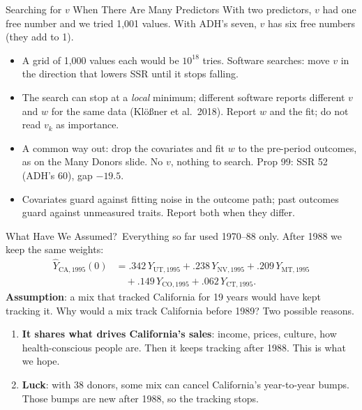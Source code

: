 \documentclass[aspectratio=169,11pt,xcolor=dvipsnames]{beamer}
\newcommand{\srcp}[1]{{\scriptsize\color{gray}(#1)}}
\newcommand{\core}{\,\raisebox{0.6pt}{\textcolor{corestar}{$\bigstar$}}}
\begin{document}
\begin{frame}{Searching for $v$ When There Are Many Predictors}
With two predictors, $v$ had one free number and we tried 1,001 values. With
ADH's seven, $v$ has six free numbers (they add to 1).
\vskip2pt
\begin{itemize}\itemsep3pt
  \item A grid of 1,000 values each would be $10^{18}$ tries. Software
        \alert{searches}: move $v$ in the direction that lowers SSR until it
        stops falling.
  \item The search can stop at a \emph{local} minimum; different software
        reports different $v$ and $w$ for the same data \srcp{Klößner et al.\
        2018}. Report $w$ and the fit; do not read $v_k$ as importance.
  \item A common way out: drop the covariates and fit $w$ to the pre-period
        outcomes, as on the Many Donors slide. No $v$, nothing to search.
        Prop 99: SSR 52 (ADH's 60), gap $-19.5$.
  \item Covariates guard against fitting noise in the outcome path; past
        outcomes guard against unmeasured traits. Report both when they differ.
\end{itemize}
\end{frame}

\begin{frame}{What Have We Assumed?\core}
Everything so far used 1970--88 only. After 1988 we keep the same weights:
\begin{align*}
  \hat Y_{\text{CA},1995}(0) &= .342\,Y_{\text{UT},1995} + .238\,Y_{\text{NV},1995}
  + .209\,Y_{\text{MT},1995} \\ &\quad + .149\,Y_{\text{CO},1995} + .062\,Y_{\text{CT},1995} .
\end{align*}
\textbf{Assumption}: a mix that tracked California for 19 years would have kept
tracking it.
\vskip4pt
Why would a mix track California before 1989? Two possible reasons.
\begin{enumerate}\itemsep3pt
  \item \textbf{It shares what drives California's sales}: income, prices,
        culture, how health-conscious people are. Then it keeps tracking after
        1988. \alert{This is what we hope.}
  \item \textbf{Luck}: with 38 donors, some mix can cancel California's
        year-to-year bumps. Those bumps are new after 1988, so the tracking stops.
\end{enumerate}
\end{frame}
\end{document}
